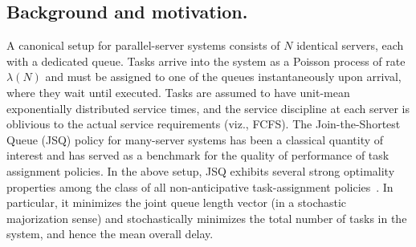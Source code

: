 \documentclass[11pt, reqno]{article}
\numberwithin{equation}{section}
\numberwithin{theorem}{section}
\begin{document}
\subsection{Background and motivation.}
A canonical setup for parallel-server systems consists of $N$ identical servers, each with a dedicated queue.
Tasks arrive into the system as a Poisson process of rate $\lambda(N)$ and must be assigned to one of the queues instantaneously upon arrival, where they wait until executed. 
Tasks are assumed to have unit-mean exponentially distributed service
times, and the service discipline at each server is oblivious to the actual service requirements (viz., FCFS).
The Join-the-Shortest Queue (JSQ) policy for many-server systems has been a classical quantity of interest and has served as a benchmark for the quality of performance of task assignment policies. 
In the above setup, JSQ exhibits several strong optimality properties among the class of all non-anticipative task-assignment policies~\cite{EVW80, Winston77}.
In particular, it minimizes the joint queue length vector (in a stochastic majorization sense) and stochastically minimizes the total number of tasks in the system, and hence the mean overall delay.
\end{document}

